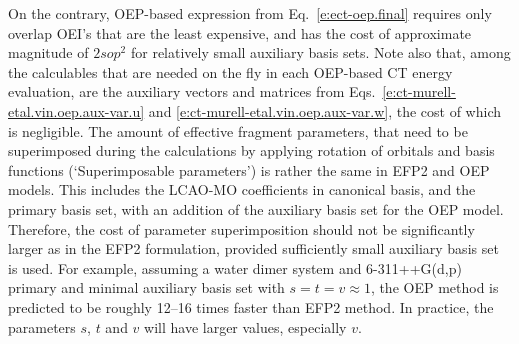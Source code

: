 \documentclass[aip,jcp,amsmath,amssymb,reprint,floatfix]{revtex4-1}
\begin{document}
%
On the contrary, 
OEP\hyp{}based expression
from Eq.~\eqref{e:ect-oep.final} requires only overlap OEI's that are the least expensive, 
and has the cost of approximate magnitude of $2sop^2$ for relatively small auxiliary basis sets.
Note also that, among the calculables that are needed on the fly in each
OEP\hyp{}based CT energy evaluation, are the auxiliary vectors and matrices 
from Eqs.~\eqref{e:ct-murell-etal.vin.oep.aux-var.u}
and \eqref{e:ct-murell-etal.vin.oep.aux-var.w},
the cost of which is negligible. The amount of effective fragment parameters,
that need to be superimposed during the calculations by applying rotation
of orbitals and basis functions (`Superimposable parameters')
is rather the same in EFP2 and OEP models. 
This includes the LCAO\hyp{}MO coefficients in canonical basis,
and the primary basis set, with an addition of the auxiliary basis set
for the OEP model. Therefore, the cost of parameter superimposition should
not be significantly larger as in the EFP2 formulation, provided sufficiently 
small auxiliary basis set is used.
For example,
assuming a water dimer system and 6-311++G(d,p) primary and minimal auxiliary basis set
with $s=t=v\approx1$,
the OEP method is predicted to be roughly 12--16 times faster than EFP2 method. In practice,
the parameters $s$, $t$ and $v$ will have larger values, especially $v$.
\end{document}
